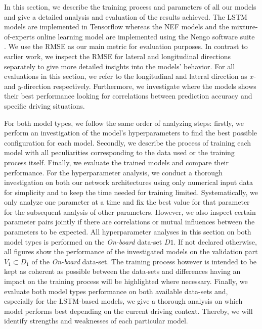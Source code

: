 In this section, we describe the training process and parameters of all our models and give a detailed analysis and evaluation of the results achieved.
The \ac{LSTM} models are implemented in Tensorflow \cite{Abadi2016} whereas the \ac{NEF} models and the mixture-of-experts online learning model are implemented using the \acs{Nengo} software suite \cite{Bekolay2014}.
We use the \ac{RMSE} as our main metric for evaluation purposes.
In contrast to earlier work, we inspect the \ac{RMSE} for lateral and longitudinal directions separately to give more detailed insights into the models' behavior.
For all evaluations in this section, we refer to the longitudinal and lateral direction as $x$- and $y$-direction respectively.
Furthermore, we investigate where the models shows their best performance looking for correlations between prediction accuracy and specific driving situations.

For both model types, we follow the same order of analyzing steps: firstly, we perform an investigation of the model's hyperparameters to find the best possible configuration for each model.
Secondly, we describe the process of training each model with all peculiarities corresponding to the data used or the training process itself.
Finally, we evaluate the trained models and compare their performance.
For the hyperparameter analysis, we conduct a thorough investigation on both our network architectures using only numerical input data for simplicity and to keep the time needed for training limited.
Systematically, we only analyze one parameter at a time and fix the best value for that parameter for the subsequent analysis of other parameters.
However, we also inspect certain parameter pairs jointly if there are correlations or mutual influences between the parameters to be expected.
All hyperparameter analyses in this section on both model types is performed on the \emph{On-board} data-set $D1$.
If not declared otherwise, all figures show the performance of the investigated models on the validation part $V_1 \subset D_1$ of the \emph{On-board} data-set.
The training process however is intended to be kept as coherent as possible between the data-sets and differences having an impact on the training process will be highlighted where necessary.
Finally, we evaluate both model types performance on both available data-sets and, especially for the \ac{LSTM}-based models, we give a thorough analysis on which model performs best depending on the current driving context.
Thereby, we will identify strengths and weaknesses of each particular model.

